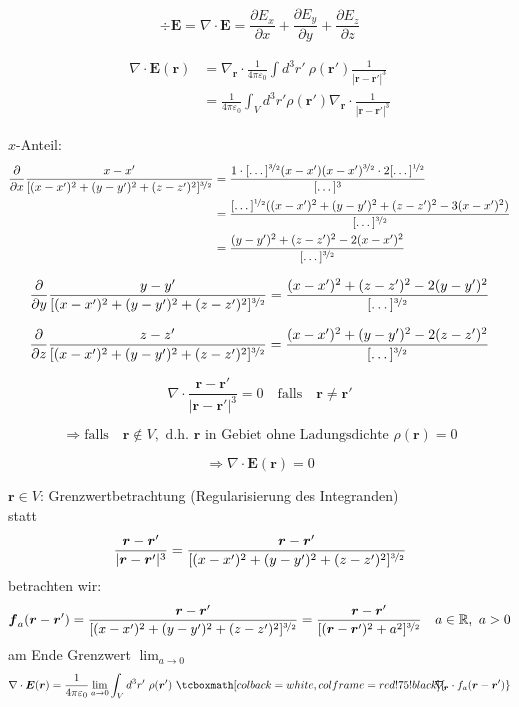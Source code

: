 \documentclass[titlepage,11pt,a4paper,ngerman]{report}
\newcommand{\prt}[2]{\frac{\partial #1}{\partial #2}}
\newcommand{\kq}{\frac{1}{4\pi\epsilon_0}}
\renewcommand{\vec}[1]{\boldsymbol{#1}}
\renewcommand{\epsilon}{\varepsilon}
\newcommand{\rmbox}[1]{\tcboxmath[colback=white,colframe=red!75!black]{#1}}
\begin{document}
$$\div \vec{E} = \nabla \cdot \vec{E} = \prt{E_x}{x} + \prt{E_y}{y} + \prt{E_z}{z}$$

\begin{align*}
\nabla \cdot \vec{E}(\vec{r}) &= \nabla_{\vec{r}} \cdot \kq \int d^3r'\ \rho(\vec{r}') \frac{1}{|\vec{r} - \vec{r}'|^3}\\
&= \kq \int_V d^3 r' \rho (\vec{r}') \nabla_{\vec{r}} \cdot \frac{1}{|\vec{r} - \vec{r}'|^3}
\end{align*}

$x$-Anteil:
\begin{align*}
\frac{\partial}{\partial x}\frac{x-x'}{[(x-x')^2 + (y-y')^2 + (z-z')^2]^{\nicefrac{3}{2}}} &= \frac{1 \cdot [\dots]^{\nicefrac{3}{2}}(x - x')(x - x')^{\nicefrac{3}{2}}\cdot 2[\dots]^{\nicefrac{1}{2}}}{[\dots]^3}\\
&= \frac{[\dots]^{\nicefrac{1}{2}}((x - x')^2 + (y - y')^2 + (z - z')^2 - 3(x - x')^2)}{[\dots]^{\nicefrac{3}{2}}}\\
&= \frac{(y - y')^2 + (z - z')^2 - 2(x - x')^2}{[\dots]^{\nicefrac{3}{2}}}
\end{align*}

$$\frac{\partial}{\partial y} \frac{y-y'}{[(x-x')^2 + (y-y')^2 + (z-z')^2]^{\nicefrac{3}{2}}} = \frac{(x - x')^2 + (z - z')^2 - 2(y - y')^2}{[\dots]^{\nicefrac{3}{2}}}$$ 

$$\frac{\partial}{\partial z} \frac{z-z'}{[(x-x')^2 + (y-y')^2 + (z-z')^2]^{\nicefrac{3}{2}}} = \frac{(x - x')^2 + (y - y')^2 - 2(z - z')^2}{[\dots]^{\nicefrac{3}{2}}}$$ 

$$\nabla \cdot \frac{\vec{r} - \vec{r}'}{|\vec{r} - \vec{r}'|^3} = 0 \quad \textrm{falls} \quad \vec{r} \neq \vec{r}'$$

$$\Rightarrow \textrm{falls} \quad \vec{r} \notin V, \textrm{ d.h. } \vec{r} \textrm{ in Gebiet ohne Ladungsdichte } \rho(\vec{r}) = 0$$

$$\Rightarrow \nabla \cdot \vec{E}(\vec{r}) = 0$$ 







\noindent
$\vec{r} \in V$: Grenzwertbetrachtung (Regularisierung des Integranden)\\
statt
$$\frac{\vec{r} - \vec{r}'}{|\vec{r} - \vec{r}'|^3} = \frac{\vec{r}-\vec{r}'}{[(x-x')^2 + (y-y')^2 + (z-z')^2]^{\nicefrac{3}{2}}}$$
betrachten wir:
$$\vec{f}_a (\vec{r}-\vec{r}') = \frac{\vec{r}-\vec{r}'}{[(x-x')^2 + (y-y')^2 + (z-z')^2]^{\nicefrac{3}{2}}} = \frac{\vec{r}-\vec{r}'}{[(\vec{r}-\vec{r}')^2 + a^2]^{\nicefrac{3}{2}}} \quad a \in \mathbb R,\ a>0$$
am Ende Grenzwert $\displaystyle{\lim_{a \to 0}}$
$$\nabla \cdot \vec{E} (\vec{r}) = \kq \lim_{a \to 0} \int_V d^3r'\ \rho(\vec{r}')\ \rmbox{\hspace{-10pt}\nabla_{\vec{r}}\cdot f_a(\vec{r}-\vec{r}')}$$
\end{document}
